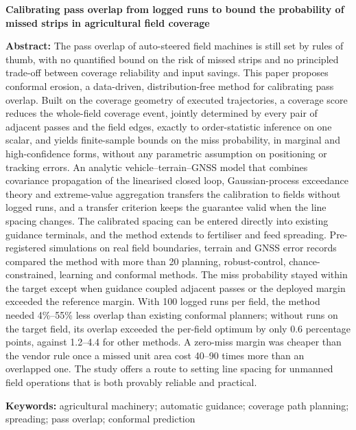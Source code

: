 \documentclass[preprint,12pt,number,sort&compress]{elsarticle}
\begin{document}


\clearpage
\begin{center}{\large\bfseries Calibrating pass overlap from logged runs to bound the probability of missed strips in agricultural field coverage}\end{center}
\par\indent\textbf{Abstract:} The pass overlap of auto-steered field machines is still set by rules of thumb, with no quantified bound on the risk of missed strips and no principled trade-off between coverage reliability and input savings. This paper proposes conformal erosion, a data-driven, distribution-free method for calibrating pass overlap. Built on the coverage geometry of executed trajectories, a coverage score reduces the whole-field coverage event, jointly determined by every pair of adjacent passes and the field edges, exactly to order-statistic inference on one scalar, and yields finite-sample bounds on the miss probability, in marginal and high-confidence forms, without any parametric assumption on positioning or tracking errors. An analytic vehicle--terrain--GNSS model that combines covariance propagation of the linearised closed loop, Gaussian-process exceedance theory and extreme-value aggregation transfers the calibration to fields without logged runs, and a transfer criterion keeps the guarantee valid when the line spacing changes. The calibrated spacing can be entered directly into existing guidance terminals, and the method extends to fertiliser and feed spreading. Pre-registered simulations on real field boundaries, terrain and GNSS error records compared the method with more than 20 planning, robust-control, chance-constrained, learning and conformal methods. The miss probability stayed within the target except when guidance coupled adjacent passes or the deployed margin exceeded the reference margin. With 100 logged runs per field, the method needed 4\%--55\% less overlap than existing conformal planners; without runs on the target field, its overlap exceeded the per-field optimum by only 0.6 percentage points, against 1.2--4.4 for other methods. A zero-miss margin was cheaper than the vendor rule once a missed unit area cost 40--90 times more than an overlapped one. The study offers a route to setting line spacing for unmanned field operations that is both provably reliable and practical.

\noindent\textbf{Keywords:} agricultural machinery; automatic guidance; coverage path planning; spreading; pass overlap; conformal prediction
\end{document}
